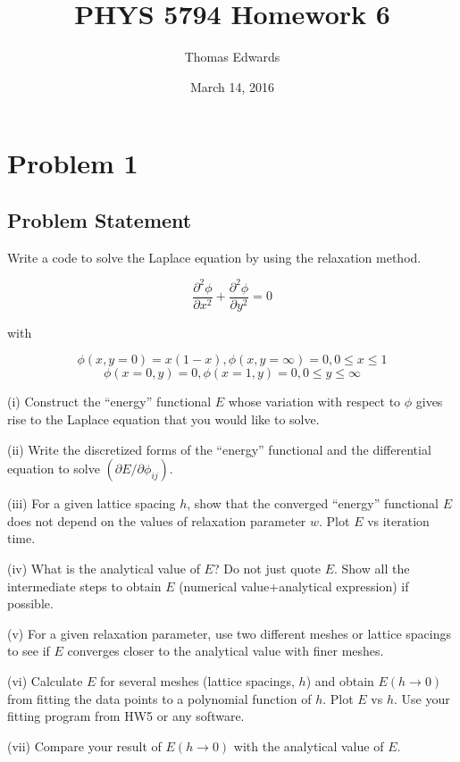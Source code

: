 \documentclass[10pt,letter]{article}
\begin{document}
\begin{titlepage}
\title{PHYS 5794 Homework 6}
\date{March 14, 2016}
\author{Thomas Edwards}
\maketitle
\end{titlepage}

\section{Problem 1}

\subsection{Problem Statement}

Write a code to solve the Laplace equation by using the relaxation method.

$$ \frac{\partial^2\phi}{\partial x^2} + \frac{\partial^2\phi}{\partial y^2} = 0 $$

with

$$ \phi(x,y=0) = x(1-x), \phi(x, y=\infty) = 0, 0 \le x \le 1$$
$$ \phi(x=0,y) = 0, \phi(x=1, y) = 0, 0 \le y \le \infty$$

(i) Construct the “energy” functional $E$ whose variation with respect to $\phi$ gives rise to the
Laplace equation that you would like to solve.

(ii) Write the discretized forms of the “energy” functional and the differential equation to solve
$(\partial E / \partial \phi_{ij} )$.

(iii) For a given lattice spacing $h$, show that the converged “energy” functional $E$ does not
depend on the values of relaxation parameter $w$. Plot $E$ vs iteration time.

(iv) What is the analytical value of $E$? Do not just quote $E$. Show all the intermediate steps
to obtain $E$ (numerical value+analytical expression) if possible.

(v) For a given relaxation parameter, use two different meshes or lattice spacings to see if $E$
converges closer to the analytical value with finer meshes.

(vi) Calculate $E$ for several meshes (lattice spacings, $h$) and obtain $E(h \rightarrow 0)$ from fitting the
data points to a polynomial function of $h$. Plot $E$ vs $h$. Use your fitting program from HW5 or
any software.

(vii) Compare your result of $E(h \rightarrow 0)$ with the analytical value of $E$.
\end{document}
